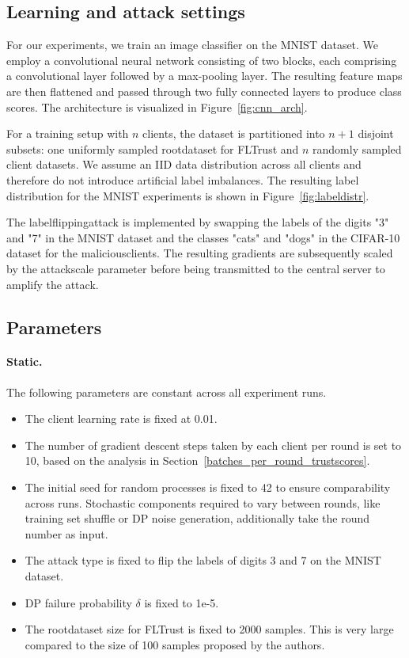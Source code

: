 \documentclass[11pt,twocolumn,a4paper,DIV=calc,parskip=half]{scrartcl}
\begin{document}
	\subsection{Learning and attack settings}
	For our experiments, we train an image classifier on the MNIST dataset. We employ a convolutional neural network consisting of two blocks, each comprising a convolutional layer followed by a max-pooling layer. The resulting feature maps are then flattened and passed through two fully connected layers to produce class scores. The architecture is visualized in Figure~\ref{fig:cnn_arch}.

	For a training setup with $n$ clients, the dataset is partitioned into $n+1$ disjoint subsets: one uniformly sampled \gls{rootdataset} for FLTrust and $n$ randomly sampled client datasets. We assume an \ac{IID} data distribution across all clients and therefore do not introduce artificial label imbalances. The resulting label distribution for the MNIST experiments is shown in Figure~\ref{fig:labeldistr}.
	
	The \gls{labelflippingattack} is implemented by swapping the labels of the digits "3" and "7" in the MNIST dataset and the classes "cats" and "dogs" in the CIFAR-10 dataset for the \glspl{maliciousclient}. The resulting gradients are subsequently scaled by the \gls{attackscale} parameter before being transmitted to the central server to amplify the attack.

	
	\subsection{Parameters}

	\paragraph{Static.} The following parameters are constant across all experiment runs.

	\begin{itemize}
		\item The client learning rate is fixed at 0.01.
		\item The number of gradient descent steps taken by each client per round is set to 10, based on the analysis in Section~\ref{batches_per_round_trustscores}.
		\item The initial seed for random processes is fixed to 42 to ensure comparability across runs. Stochastic components required to vary between rounds, like training set shuffle or DP noise generation, additionally take the round number as input.
		\item The attack type is fixed to flip the labels of digits 3 and 7 on the MNIST dataset.
		\item \ac{DP} failure probability $\delta$ is fixed to 1e-5.
		\item The \gls{rootdataset} size for FLTrust is fixed to 2000 samples. This is very large compared to the size of 100 samples proposed by the authors.
	\end{itemize}
	
\end{document}
